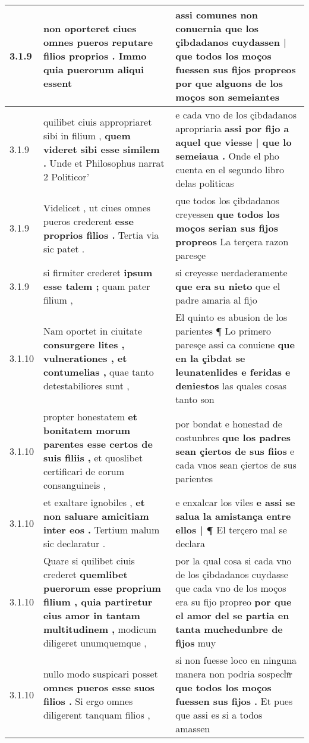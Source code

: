 \begin{tabular}{|p{1cm}|p{6.5cm}|p{6.5cm}|}
3.1.9 & non oporteret ciues \textbf{ omnes pueros reputare filios proprios . } Immo quia puerorum aliqui essent & assi comunes non conuernia \textbf{ que los çibdadanos cuydassen | que todos los moços fuessen sus fijos propreos } por que alguons de los moços son semeiantes \\\hline
3.1.9 & quilibet ciuis appropriaret sibi in filium , \textbf{ quem videret sibi esse similem . } Unde et Philosophus narrat 2 Politicor’ & e cada vno de los çibdadanos apropriaria \textbf{ assi por fijo a aquel que viesse | que lo semeiaua . } Onde el pho cuenta en el segundo libro delas politicas \\\hline
3.1.9 & Videlicet , ut ciues omnes pueros crederent \textbf{ esse proprios filios . } Tertia via sic patet . & que todos los çibdadanos creyessen \textbf{ que todos los moços serian sus fijos propreos } La terçera razon paresçe \\\hline
3.1.9 & si firmiter crederet \textbf{ ipsum esse talem ; } quam pater filium , & si creyesse uerdaderamente \textbf{ que era su nieto } que el padre amaria al fijo \\\hline
3.1.10 & Nam oportet in ciuitate \textbf{ consurgere lites , vulnerationes , et contumelias , } quae tanto detestabiliores sunt , & El quinto es abusion de los parientes ¶ Lo primero paresçe assi ca conuiene \textbf{ que en la çibdat se leunatenlides e feridas e deniestos } las quales cosas tanto son \\\hline
3.1.10 & propter honestatem \textbf{ et bonitatem morum parentes esse certos de suis filiis , } et quoslibet certificari de eorum consanguineis , & por bondat e honestad de costunbres \textbf{ que los padres sean çiertos de sus fiios } e cada vnos sean çiertos de sus parientes \\\hline
3.1.10 & et exaltare ignobiles , \textbf{ et non saluare amicitiam inter eos . } Tertium malum sic declaratur . & e enxalcar los viles \textbf{ e assi se salua la amistança entre ellos | ¶ } El terçero mal se declara \\\hline
3.1.10 & Quare si quilibet ciuis crederet \textbf{ quemlibet puerorum esse proprium filium , quia partiretur eius amor in tantam multitudinem , } modicum diligeret unumquemque , & por la qual cosa si cada vno de los çibdadanos cuydasse que cada vno de los moços era su fijo propreo \textbf{ por que el amor del se partia en tanta muchedunbre de fijos } muy \\\hline
3.1.10 & nullo modo suspicari posset \textbf{ omnes pueros esse suos filios . } Si ergo omnes diligerent tanquam filios , & si non fuesse loco en ninguna manera non podria sospechͣr \textbf{ que todos los moços fuessen sus fijos . } Et pues que assi es si a todos amassen \\\hline

\end{tabular}

